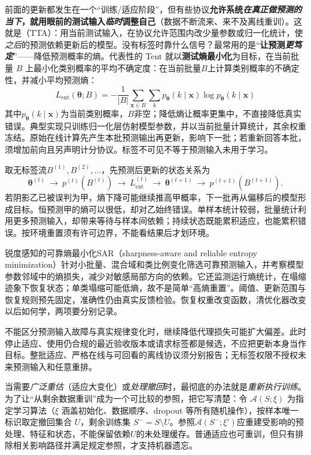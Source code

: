 前面的更新都发生在一个“训练/适应阶段”，但有些协议\textbf{允许系统\emph{在\emph{真正做预测的当下}}，就用眼前的测试输入\emph{临时}调整自己}（数据不断流来、来不及离线重训）。这就是（TTA）：用当前测试输入，在协议允许范围内改少量参数或归一化统计，使\emph{之后}的预测依赖更新后的模型。没有标签时靠什么信号？最常用的是“\textbf{让预测\emph{更笃定}}”——降低预测概率的熵。代表性的 Tent 就以\textbf{测试熵最小化}为目标，在当前批量 $B$ 上最小化类别概率的平均不确定度：在当前批量$B$上计算类别概率的不确定性，并减小平均预测熵：
\[
L_{\mathrm{ent}}(\bm\theta;B)
=-\frac1{|B|}\sum_{\bm x\in B}\sum_k
p_{\bm\theta}(k\mid\bm x)\log p_{\bm\theta}(k\mid\bm x)
\]
其中$p_{\bm\theta}(k\mid\bm x)$为当前类别概率，$B$非空；降低熵让概率更集中，不直接降低真实错误。典型实现只训练归一化层仿射模型参数，并以当前批量计算统计，其余权重冻结。原始在线计算先产生本批预测输出再更新，影响下一批；若重新回答本批，须增加前向且另声明计分协议。标签不可见不等于预测输入未用于学习。

取无标签流$B^{(1)},B^{(2)},\ldots$，先预测后更新的状态关系为
\[
\bm\theta^{(t)}
\ \longrightarrow\ p^{(t)}(B^{(t)})
\ \longrightarrow\ L_{\mathrm{ent}}^{(t)}
\ \longrightarrow\ \bm\theta^{(t+1)}
\ \longrightarrow\ p^{(t+1)}(B^{(t+1)}).
\]
若阴影乙已被误判为甲，熵下降可能继续推高甲概率，下一批再从偏移后的模型形成目标。恒预测甲的熵可以很低，却对乙始终错误。单样本统计较弱，批量统计利用更多预测输入，却带来等待与样本间依赖；持续状态既能累积适应，也能累积错误。按环境重置须有许可边界，不能看结果后才划环境。

锐度感知的可靠熵最小化SAR（sharpness-aware and reliable entropy minimization）针对小批量、混合域和类比例变化筛选可靠预测输入，并考察模型参数邻域中的熵损失，减少对敏感局部方向的依赖。它还监测运行熵统计，在塌缩迹象下恢复状态；单类塌缩可能低熵，故不是简单“高熵重置”。阈值、更新范围与恢复规则预先固定，准确性仍由真实反馈检验。恢复权重改变函数，清优化器改变以后如何学，两项要分别记录。

不能区分预测输入故障与真实规律变化时，继续降低代理损失可能扩大偏差。此时停止适应、使用仍合规的最近验收版本或请求标签都是候选，不应把更新本身当作目标。整批适应、严格在线与可回看的离线协议须分别报告；无标签权限不授权未来预测输入和任意重排。

当需要\emph{广泛重估}（适应大变化）或\emph{处理撤回}时，最彻底的办法就是\emph{重新执行训练}。为了让“从剩余数据重训”成为一个可比较的参照，把它写清楚：令 $\mathcal A(S;\xi)$ 为指定学习算法（$\xi$ 涵盖初始化、数据顺序、dropout 等所有随机操作），按样本唯一标识取定撤回集合 $U$，剩余训练集 $S^-=S\setminus U$。参照$\mathcal A(S^-;\xi')$应重建受影响的预处理、特征和状态，不能保留依赖$U$的未处理缓存。普通适应也可重训，但只有排除相关影响路径并满足规定参照，才支持机器遗忘。

